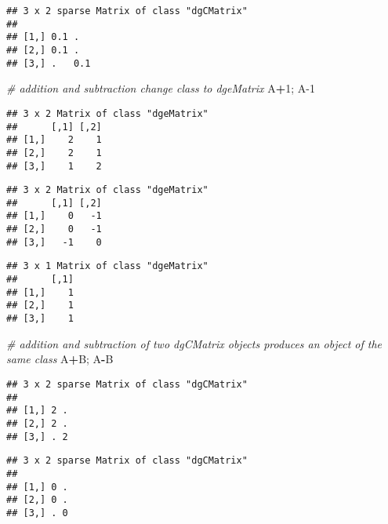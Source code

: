 \documentclass[]{article}
\newenvironment{Shaded}{\begin{snugshade}}{\end{snugshade}}
\newcommand{\CommentTok}[1]{\textcolor[rgb]{0.56,0.35,0.01}{\textit{#1}}}
\newcommand{\DecValTok}[1]{\textcolor[rgb]{0.00,0.00,0.81}{#1}}
\newcommand{\KeywordTok}[1]{\textcolor[rgb]{0.13,0.29,0.53}{\textbf{#1}}}
\newcommand{\NormalTok}[1]{#1}
\newcommand{\OperatorTok}[1]{\textcolor[rgb]{0.81,0.36,0.00}{\textbf{#1}}}
\newcommand{\StringTok}[1]{\textcolor[rgb]{0.31,0.60,0.02}{#1}}
\begin{document}
\begin{verbatim}
## 3 x 2 sparse Matrix of class "dgCMatrix"
##             
## [1,] 0.1 .  
## [2,] 0.1 .  
## [3,] .   0.1
\end{verbatim}

\begin{Shaded}
\begin{Highlighting}[]
\CommentTok{# addition and subtraction change class to dgeMatrix}
\NormalTok{A}\OperatorTok{+}\DecValTok{1}\NormalTok{; A}\DecValTok{-1}
\end{Highlighting}
\end{Shaded}

\begin{verbatim}
## 3 x 2 Matrix of class "dgeMatrix"
##      [,1] [,2]
## [1,]    2    1
## [2,]    2    1
## [3,]    1    2
\end{verbatim}

\begin{verbatim}
## 3 x 2 Matrix of class "dgeMatrix"
##      [,1] [,2]
## [1,]    0   -1
## [2,]    0   -1
## [3,]   -1    0
\end{verbatim}

\begin{Shaded}
\end{Shaded}

\begin{verbatim}
## 3 x 1 Matrix of class "dgeMatrix"
##      [,1]
## [1,]    1
## [2,]    1
## [3,]    1
\end{verbatim}

\begin{Shaded}
\begin{Highlighting}[]
\CommentTok{# addition and subtraction of two dgCMatrix objects produces an object of the same class}
\NormalTok{A}\OperatorTok{+}\NormalTok{B; A}\OperatorTok{-}\NormalTok{B}
\end{Highlighting}
\end{Shaded}

\begin{verbatim}
## 3 x 2 sparse Matrix of class "dgCMatrix"
##         
## [1,] 2 .
## [2,] 2 .
## [3,] . 2
\end{verbatim}

\begin{verbatim}
## 3 x 2 sparse Matrix of class "dgCMatrix"
##         
## [1,] 0 .
## [2,] 0 .
## [3,] . 0
\end{verbatim}
\end{document}
